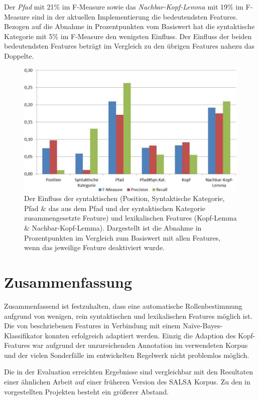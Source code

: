 \documentclass[12pt]{article}
\begin{document}
Der \textit{Pfad} mit 21\% im F-Measure sowie das \textit{Nachbar-Kopf-Lemma} mit 19\% im F-Measure sind in der aktuellen Implementierung die bedeutendsten Features. Bezogen auf die Abnahme in Prozentpunkten vom Basiswert hat die syntaktische Kategorie mit 5\% im F-Measure den wenigsten Einfluss. Der Einfluss der beiden bedeutendsten Features beträgt im Vergleich zu den übrigen Features nahezu das Doppelte.

	\begin{figure}[tb!]
		\centering		
		\includegraphics[scale=0.9]{images/featureImpact_sorted.jpg}
		\caption[Einfluss der genutzten Features]{Der Einfluss der syntaktischen (Position, Syntaktische Kategorie, Pfad \& das aus dem Pfad und der syntaktischen Kategorie zusammengesetzte Feature) und lexikalischen Features (Kopf-Lemma \& Nachbar-Kopf-Lemma). Dargestellt ist die Abnahme in Prozentpunkten im Vergleich zum Basiswert mit allen Features, wenn das jeweilige Feature deaktiviert wurde.}
		\label{featureImpact}
	\end{figure}

\section{Zusammenfassung}

Zusammenfassend ist festzuhalten, dass eine automatische Rollenbestimmung
aufgrund von wenigen, rein syntaktischen und lexikalischen Features möglich ist.
Die von \cite{gildea} beschriebenen Features in Verbindung mit einem Naïve-Bayes-Klassifikator konnten erfolgreich adaptiert werden. Einzig die Adaption des Kopf-Features war aufgrund der unzureichenden Annotation im verwendeten Korpus und der vielen Sonderfälle im entwickelten Regelwerk nicht problemlos möglich.

Die in der Evaluation erreichten Ergebnisse sind vergleichbar mit den Resultaten
einer ähnlichen Arbeit auf einer früheren Version des SALSA Korpus. Zu den in
\cite{hajivc2009conll} vorgestellten Projekten besteht ein größerer Abstand.
\end{document}
